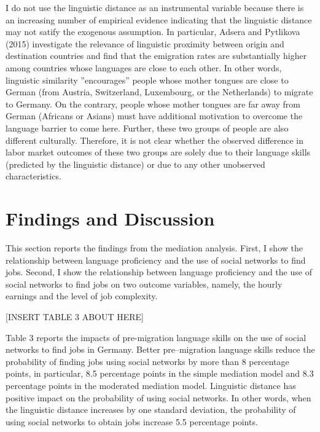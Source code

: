 \documentclass[12pt,a4paper]{article}
\begin{document}
I do not use the linguistic distance as an instrumental variable because there is an increasing number of empirical evidence indicating that the linguistic distance may not satify the exogenous assumption. In particular, Adsera and Pytlikova (2015) investigate the relevance of linguistic proximity between origin and destination countries and find that the emigration rates are substantially higher among countries whose languages are close to each other. In other words, linguistic similarity ''encourages'' people whose mother tongues are close to German (from Austria, Switzerland, Luxembourg, or the Netherlands) to migrate to Germany. On the contrary, people whose mother tongues are far away from German (Africans or Asians) must have additional motivation to overcome the language barrier to come here. Further, these two groups of people are also different culturally. Therefore, it is not clear whether the observed difference in labor market outcomes of these two groups are solely due to their language skills (predicted by the linguistic distance) or due to any other unobserved characteristics.

\section{Findings and Discussion}

This section reports the findings from the mediation analysis. First, I show the relationship between language proficiency and the use of social networks to find jobs. Second, I show the relationship between language proficiency and the use of social networks to find jobs on two outcome variables, namely, the hourly earnings and the level of job complexity. 

\begin{center}
[INSERT TABLE 3 ABOUT HERE]
\end{center}

Table 3 reports the impacts of pre-migration language skills on the use of social networks to find jobs in Germany. Better pre--migration language skills reduce the probability of finding jobs using social networks by more than 8 percentage points, in particular, 8.5 percentage points in the simple mediation model and 8.3 percentage points in the moderated mediation model. Linguistic distance has positive impact on the probability of using social networks. In other words, when the linguistic distance increases by one standard deviation, the probability of using social networks to obtain jobs increase 5.5 percentage points. 
\end{document}
